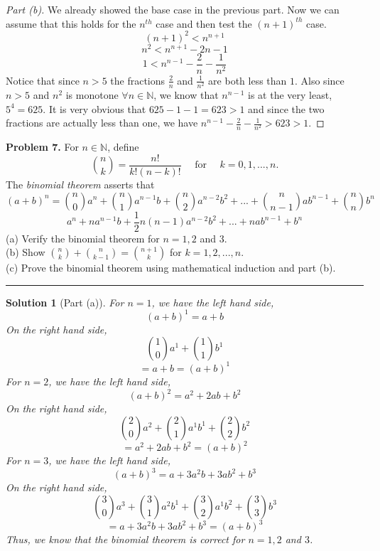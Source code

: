 \documentclass[leqno]{article}
\theoremstyle{nonumberplain}
\newtheorem{proof}{Proof}
\newtheorem{solution}{Solution}
\begin{document}
\begin{proof}[Part (b)] We already showed the base case in the previous part.  Now we can assume that this holds for the $n^{th}$ case and then test the $(n+1)^{th}$ case.  
\[
(n+1)^2<n^{n+1}
\]
\[
n^2<n^{n+1}-2n-1
\]
\[
1<n^{n-1}-\frac{2}{n}-\frac{1}{n^2}
\]
Notice that since $n>5$ the fractions $\frac{2}{n}$ and $\frac{1}{n^2}$ are both less than $1$.  Also since $n>5$ and $n^2$ is monotone $\forall n\in \mathbb{N}$, we know that $n^{n-1}$ is at the very least, $5^4=625$.  It is very obvious that $625-1-1=623>1$ and since the two fractions are actually less than one, we have $n^{n-1} -\frac{2}{n} -\frac{1}{n^2}> 623 >1$.
\end{proof}
\pagebreak




\noindent\textbf{Problem 7.} For $n \in \mathbb{N}$, define 
\[{n \choose k} = \frac{n!}{k! (n-k)!} \textrm{~~~ for ~~~} k=0,1,...,n.\]
The \emph{binomial theorem} asserts that 
\[
(a+b)^n = {n \choose 0} a^n + {n \choose 1} a^{n-1} b + { n \choose 2} a^{n-2} b^2 +...+ {n \choose n-1} a b^{n-1} + {n \choose n} b^n
\]
\[
a^n +na^{n-1}b+\frac{1}{2}n (n-1) a^{n-2}b^2+...+nab^{n-1}+b^n
\]
(a) Verify the binomial theorem for $n=1,2$ and $3$. \\
(b) Show ${n \choose k} + {n \choose k-1} = { n+1 \choose k}$ for $k=1,2,...,n$.\\
(c) Prove the binomial theorem using mathematical induction and part (b).

\noindent\rule[0.5ex]{\linewidth}{1pt}

\begin{solution}[Part (a)] For $n=1$, we have the left hand side,
\[
(a+b)^1 = a +b
\]
On the right hand side,
\[
{1 \choose 0} a^1 + {1 \choose 1} b^1
\]
\[
=a +b = (a+b)^1
\]
For $n=2$, we have the left hand side,
\[
(a+b)^2 = a^2 +2ab +b^2
\]
On the right hand side,
\[
{2 \choose 0} a^2 + {2 \choose 1} a^1 b^1 + {2 \choose 2} b^2
\]
\[
=a^2 + 2ab + b^2 = (a+b)^2
\]
For $n=3$, we have the left hand side,
\[
(a+b)^3 = a + 3a^2 b +3a b^2 + b^3
\]
On the right hand side,
\[
{3 \choose 0} a^3 + {3 \choose 1} a^2 b^1 + {3 \choose 2} a^1 b^2 + {3 \choose 3} b^3
\]
\[
=a + 3a^2 b +3a b^2 + b^3 =(a+b)^3
\]
Thus, we know that the binomial theorem is correct for $n=1,2$ and $3$.
\end{solution}
\end{document}
